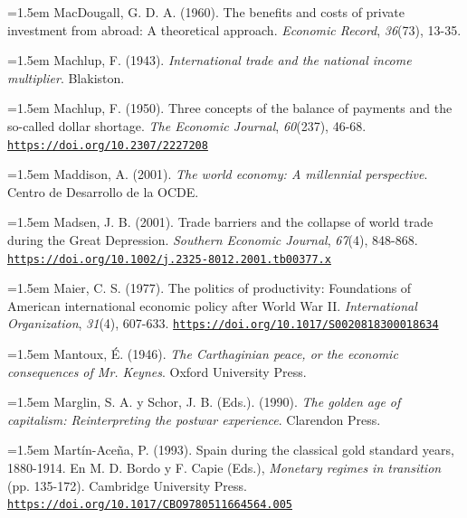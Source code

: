 \documentclass[10pt,a4paper]{article}
\begin{document}
\noindent\hangindent=1.5em MacDougall, G. D. A. (1960). The benefits and costs of private investment from abroad: A theoretical approach. \textit{Economic Record}, \textit{36}(73), 13-35.

\noindent\hangindent=1.5em Machlup, F. (1943). \textit{International trade and the national income multiplier}. Blakiston.

{\sloppy\noindent\hangindent=1.5em Machlup, F. (1950). Three concepts of the balance of payments and the so-called dollar shortage. \textit{The Economic Journal}, \textit{60}(237), 46-68. \href{https://doi.org/10.2307/2227208}{\nolinkurl{https://doi.org/10.2307/2227208}}\par}

{\sloppy\noindent\hangindent=1.5em Maddison, A. (2001). \textit{The world economy: A millennial perspective}. Centro de Desarrollo de la OCDE.\par}

{\sloppy\noindent\hangindent=1.5em Madsen, J. B. (2001). Trade barriers and the collapse of world trade during the Great Depression. \textit{Southern Economic Journal}, \textit{67}(4), 848-868. \href{https://doi.org/10.1002/j.2325-8012.2001.tb00377.x}{\nolinkurl{https://doi.org/10.1002/j.2325-8012.2001.tb00377.x}}\par}

{\sloppy\noindent\hangindent=1.5em Maier, C. S. (1977). The politics of productivity: Foundations of American international economic policy after World War II. \textit{International Organization}, \textit{31}(4), 607-633. \href{https://doi.org/10.1017/S0020818300018634}{\nolinkurl{https://doi.org/10.1017/S0020818300018634}}\par}

{\sloppy\noindent\hangindent=1.5em Mantoux, É. (1946). \textit{The Carthaginian peace, or the economic consequences of Mr. Keynes}. Oxford University Press.\par}

{\sloppy\noindent\hangindent=1.5em Marglin, S. A. y Schor, J. B. (Eds.). (1990). \textit{The golden age of capitalism: Reinterpreting the postwar experience}. Clarendon Press.\par}

{\sloppy\noindent\hangindent=1.5em Martín-Aceña, P. (1993). Spain during the classical gold standard years, 1880-1914. En M. D. Bordo y F. Capie (Eds.), \textit{Monetary regimes in transition} (pp. 135-172). Cambridge University Press. \href{https://doi.org/10.1017/CBO9780511664564.005}{\nolinkurl{https://doi.org/10.1017/CBO9780511664564.005}}\par}
\end{document}
